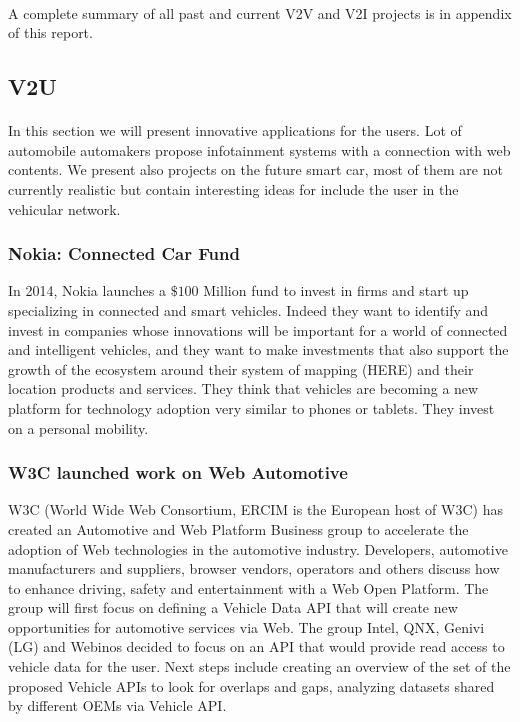\documentclass[a4paper]{article}
\begin{document}
\paragraph{}A complete summary of all past and current V2V and V2I projects is in appendix of this report.
 
\subsection{V2U}
\paragraph{}In this section we will present innovative applications for the users. Lot of automobile automakers propose infotainment systems with a connection with web contents. We present also projects on the future smart car, most of them are not currently realistic but contain interesting ideas for include the user in the vehicular network.  

\subsubsection{Nokia: Connected Car Fund}

In 2014, Nokia launches a $\$100$ Million fund to invest in firms and start up specializing in connected and smart vehicles. Indeed they want to identify and invest in companies whose innovations will be important for a world of connected and intelligent vehicles, and they want to make investments that also support the growth of the ecosystem around their system of mapping (HERE) and their location products and services. They think that vehicles are becoming a new platform for technology adoption very similar to phones or tablets. They invest on a personal mobility.

\subsubsection{W3C launched work on Web Automotive}

W3C (World Wide Web Consortium, ERCIM is the European host of W3C) has created an Automotive and Web Platform Business group to accelerate the adoption of Web technologies in the automotive industry. Developers, automotive manufacturers and suppliers, browser vendors, operators and others discuss how to enhance driving, safety and entertainment with a Web Open Platform. The group will first focus on defining a Vehicle Data API that will create new opportunities for automotive services via Web. The group Intel, QNX, Genivi (LG) and Webinos decided to focus on an API that would provide read access to vehicle data for the user. Next steps include creating an overview of the set of the proposed Vehicle APIs to look for overlaps and gaps, analyzing datasets shared by different OEMs via Vehicle API.
\end{document}
